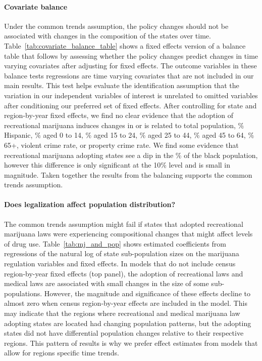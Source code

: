 \documentclass[12pt]{article}%
\begin{document}
\paragraph{Covariate balance}
Under the common trends assumption, the policy changes should not be associated with changes in the composition of the states over time. Table~\ref{tab:covariate_balance_table} shows a fixed effects version of a balance table that follows \citet{Pei2019} by assessing whether the policy changes predict changes in time varying covariates after adjusting for fixed effects. The outcome variables in these balance tests regressions are time varying covariates that are not included in our main results. This test helps evaluate the identification assumption that the variation in our independent variables of interest is unrelated to omitted variables after conditioning our preferred set of fixed effects. After controlling for state and region-by-year fixed effects, we find no clear evidence that the adoption of recreational marijuana induces changes in or is related to total population, \% Hispanic, \% aged 0 to 14, \% aged 15 to 24,  \% aged 25 to 44,  \% aged 45 to 64, \% 65+,  violent crime rate, or property crime rate. We find some evidence that recreational marijuana adopting states see a dip in the \% of the  black population, however this difference is only significant at the 10\% level and is small in magnitude. Taken together the results from the balancing supports the common trends assumption.

\paragraph{Does legalization affect population distribution?}
The common trends assumption might fail if states that adopted recreational marijuana laws were experiencing compositional changes that might affect levels of drug use. Table~\ref{tab:mj_and_pop} shows estimated coefficients from regressions of the natural log of state sub-population sizes on the marijuana regulation variables and fixed effects. In models that do not include census region-by-year fixed effects (top panel), the adoption of recreational laws and medical laws are associated with small changes in the size of some sub-populations. However, the magnitude and significance of these effects decline to almost zero when census region-by-year effects are included in the model. This may indicate that the regions where recreational and medical marijuana law adopting states are located had changing population patterns, but the adopting states did not have differential population changes relative to their respective regions. This pattern of results is why we prefer effect estimates from models that allow for regions specific time trends. 
\end{document}
